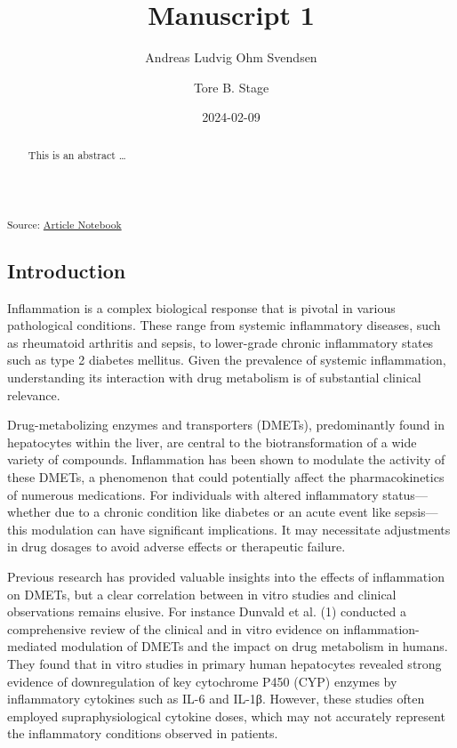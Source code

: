 \documentclass[
  letterpaper,
  DIV=11,
  numbers=noendperiod,
  oneside]{scrartcl}
\title{Manuscript 1}
\author{Andreas Ludvig Ohm Svendsen \and Tore B. Stage}
\date{2024-02-09}
\begin{document}
\maketitle
\begin{abstract}
This is an abstract \ldots{}
\end{abstract}

\textsubscript{Source:
\href{https://andreasludvig.github.io/manuscript/index.qmd.html}{Article
Notebook}}

\subsection{Introduction}\label{introduction}

Inflammation is a complex biological response that is pivotal in various
pathological conditions. These range from systemic inflammatory
diseases, such as rheumatoid arthritis and sepsis, to lower-grade
chronic inflammatory states such as type 2 diabetes mellitus. Given the
prevalence of systemic inflammation, understanding its interaction with
drug metabolism is of substantial clinical relevance.

Drug-metabolizing enzymes and transporters (DMETs), predominantly found
in hepatocytes within the liver, are central to the biotransformation of
a wide variety of compounds. Inflammation has been shown to modulate the
activity of these DMETs, a phenomenon that could potentially affect the
pharmacokinetics of numerous medications. For individuals with altered
inflammatory status---whether due to a chronic condition like diabetes
or an acute event like sepsis---this modulation can have significant
implications. It may necessitate adjustments in drug dosages to avoid
adverse effects or therapeutic failure.

Previous research has provided valuable insights into the effects of
inflammation on DMETs, but a clear correlation between in vitro studies
and clinical observations remains elusive. For instance Dunvald et al.
(1) conducted a comprehensive review of the clinical and in vitro
evidence on inflammation-mediated modulation of DMETs and the impact on
drug metabolism in humans. They found that in vitro studies in primary
human hepatocytes revealed strong evidence of downregulation of key
cytochrome P450 (CYP) enzymes by inflammatory cytokines such as IL-6 and
IL-1β. However, these studies often employed supraphysiological cytokine
doses, which may not accurately represent the inflammatory conditions
observed in patients.
\end{document}
